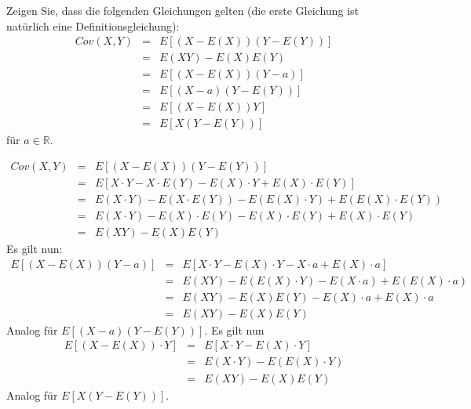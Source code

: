 \begin{Exercise}
	Zeigen Sie, dass die folgenden Gleichungen gelten (die
	erste Gleichung ist nat\"{u}rlich eine Definitionsgleichung):%
	\begin{eqnarray*}
		Cov(X,Y) &=&E\left[ \left( X-E(X)\right) \left( Y-E(Y)\right) \right]  \\
		&=&E(XY)-E(X)E(Y) \\
		&=&E\left[ \left( X-E(X)\right) \left( Y-a\right) \right]  \\
		&=&E\left[ \left( X-a\right) \left( Y-E(Y)\right) \right]  \\
		&=&E\left[ \left( X-E(X)\right) Y\right]  \\
		&=&E\left[ X\left( Y-E(Y)\right) \right] 
	\end{eqnarray*}%
	f\"{u}r $a\in \mathbb{R}.$
\end{Exercise}

\begin{Answer}
	\begin{eqnarray*}
		Cov(X,Y)&=&E\left[ \left( X-E(X)\right) \left( Y-E(Y)\right) \right]\\
		&=&E\left[X\cdot Y-X\cdot E(Y)-E(X)\cdot Y+E(X)\cdot E(Y)\right]\\
		&=&E(X\cdot Y)-E(X\cdot E(Y))-E(E(X)\cdot Y)+E(E(X)\cdot E(Y))\\
		&=&E(X\cdot Y)-E(X)\cdot E(Y)-E(X)\cdot E(Y)+E(X)\cdot E(Y)\\
		&=&E(XY)-E(X)E(Y)
	\end{eqnarray*}
	Es gilt nun:
	\begin{eqnarray*}
		E\left[ \left( X-E(X)\right) \left( Y-a\right) \right] &=& E\left[X\cdot Y-E(X)\cdot Y-X\cdot a+E(X)\cdot a \right]\\
		&=&E(XY)- E(E(X)\cdot Y)-E(X\cdot a)+E(E(X)\cdot a)\\
		&=&E(XY)-E(X)E(Y)-E(X)\cdot a+E(X)\cdot a\\
		&=&E(XY)-E(X)E(Y)
	\end{eqnarray*}
	Analog für $E\left[ \left( X-a\right) \left( Y-E(Y)\right) \right] $. Es gilt nun
	\begin{eqnarray*}
		E\left[(X-E(X))\cdot Y\right]&=&E\left[X\cdot Y-E(X)\cdot Y\right]\\
		&=& E(X\cdot Y)-E(E(X)\cdot Y)\\
		&=&E(XY)-E(X)E(Y)
	\end{eqnarray*}
	Analog für $E\left[ X\left( Y-E(Y)\right) \right] $.
\end{Answer}

